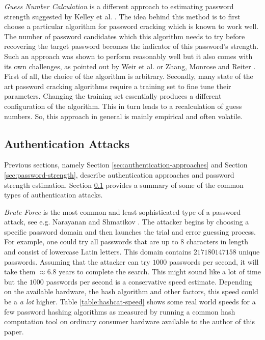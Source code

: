 \emph{Guess Number Calculation} is a different approach to estimating password strength suggested by Kelley et al. \cite{kelley2012guess}. The idea behind this method is to first choose a particular algorithm for password cracking which is known to work well. The number of password candidates which this algorithm needs to try before recovering the target password becomes the indicator of this password's strength. Such an approach was shown to perform reasonably well but it also comes with its own challenges, as pointed out by Weir et al. \cite{weir2010testing} or Zhang, Monrose and Reiter \cite{zhang2010security}. First of all, the choice of the algorithm is arbitrary. Secondly, many state of the art password cracking algorithms require a training set to fine tune their parameters. Changing the training set essentially produces a different configuration of the algorithm. This in turn leads to a recalculation of guess numbers. So, this approach in general is mainly empirical and often volatile.

\subsection{Authentication Attacks}
\label{sec:authentication-attacks}

Previous sections, namely Section \ref{sec:authentication-approaches} and Section \ref{sec:password-strength}, describe authentication approaches and password strength estimation. Section \ref{sec:authentication-attacks} provides a summary of some of the common types of authentication attacks.

\emph{Brute Force} is the most common and least sophisticated type of a password attack, see e.g. Narayanan and Shmatikov \cite{narayanan:2005:fast}. The attacker begins by choosing a specific password domain and then launches the trial and error guessing process. For example, one could try all passwords that are up to 8 characters in length and consist of lowercase Latin letters. This domain contains \(217180147158\) unique passwords. Assuming that the attacker can try \(1000\) passwords per second, it will take them \(\approx 6.8\) years to complete the search. This might sound like a lot of time but the \(1000\) passwords per second is a conservative speed estimate. Depending on the available hardware, the hash algorithm and other factors, this speed could be a \emph{a lot} higher. Table \ref{table:hashcat-speed} shows some real world speeds for a few password hashing algorithms as measured by running a common hash computation tool on ordinary consumer hardware available to the author of this paper.

